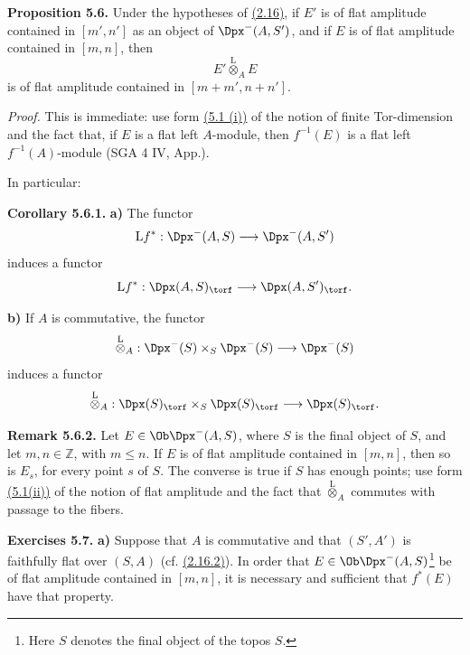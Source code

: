 \textbf{Proposition 5.6.} Under the hypotheses of \hyperlink{sga6.e01.cor.2-16}{(2.16)}, if \(E'\) is of flat amplitude contained in \([m',n']\) as an object of \(\Dpx^-(A,S')\), and if \(E\) is of flat amplitude contained in \([m,n]\), then
\[
  E'\overset{\mathrm L}{\otimes}_A E
\]
is of flat amplitude contained in \([m+m',n+n']\).

\emph{Proof.} This is immediate: use form \hyperlink{sga6.e01.prop.5-1}{(5.1 (i))} of the notion of finite Tor-dimension and the fact that, if \(E\) is a flat left \(A\)-module, then \(f^{-1}(E)\) is a flat left \(f^{-1}(A)\)-module (SGA 4 IV, App.).

In particular:

\textbf{Corollary 5.6.1.} \textbf{a)} The functor
\[
  \mathrm L f^*:\Dpx^-(A,S)\longrightarrow \Dpx^-(A,S')
\]
induces a functor
\[
  \mathrm L f^*:\Dpx(A,S)_{\torf}\longrightarrow \Dpx(A,S')_{\torf}.
\]

\textbf{b)} If \(A\) is commutative, the functor
\[
  \overset{\mathrm L}{\otimes}_A:
  \Dpx^-(S)\times_S\Dpx^-(S)\longrightarrow \Dpx^-(S)
\]
induces a functor
\[
  \overset{\mathrm L}{\otimes}_A:
  \Dpx(S)_{\torf}\times_S\Dpx(S)_{\torf}
  \longrightarrow \Dpx(S)_{\torf}.
\]

\textbf{Remark 5.6.2.} Let \(E\in\Ob\Dpx^-(A,S)\), where \(S\) is the final object of \(S\), and let \(m,n\in\mathbb Z\), with \(m\leq n\). If \(E\) is of flat amplitude contained in \([m,n]\), then so is \(E_s\), for every point \(s\) of \(S\). The converse is true if \(S\) has enough points; use form \hyperlink{sga6.e01.prop.5-1}{(5.1(ii))} of the notion of flat amplitude and the fact that \(\overset{\mathrm L}{\otimes}_A\) commutes with passage to the fibers.

\textbf{Exercises 5.7.} \textbf{a)} Suppose that \(A\) is commutative and that \((S',A')\) is faithfully flat over \((S,A)\) (cf. \hyperlink{sga6.e01.exercise.2-16-2}{(2.16.2)}). In order that \(E\in\Ob\Dpx^-(A,S)\)\footnote{Here \(S\) denotes the final object of the topos \(S\).} be of flat amplitude contained in \([m,n]\), it is necessary and sufficient that \(f^*(E)\) have that property.

